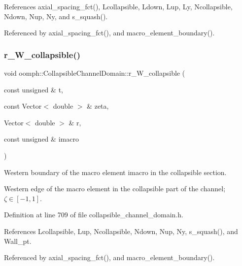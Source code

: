 References axial\+\_\+spacing\+\_\+fct(), Lcollapsible, Ldown, Lup, Ly, Ncollapsible, Ndown, Nup, Ny, and s\+\_\+squash().



Referenced by axial\+\_\+spacing\+\_\+fct(), and macro\+\_\+element\+\_\+boundary().

\mbox{\label{classoomph_1_1CollapsibleChannelDomain_ab8b0f990e596b2725ca8d84f2c9750eb}} 
\subsubsection{\texorpdfstring{r\+\_\+\+W\+\_\+collapsible()}{r\_W\_collapsible()}}
{\footnotesize\ttfamily void oomph\+::\+Collapsible\+Channel\+Domain\+::r\+\_\+\+W\+\_\+collapsible (\begin{DoxyParamCaption}\item[{const unsigned \&}]{t,  }\item[{const Vector$<$ double $>$ \&}]{zeta,  }\item[{Vector$<$ double $>$ \&}]{r,  }\item[{const unsigned \&}]{imacro }\end{DoxyParamCaption})\hspace{0.3cm}{\ttfamily [private]}}



Western boundary of the macro element imacro in the collapsible section. 

Western edge of the macro element in the collapsible part of the channel; $ \zeta \in [-1,1] $. 

Definition at line 709 of file collapsible\+\_\+channel\+\_\+domain.\+h.



References Lcollapsible, Lup, Ncollapsible, Ndown, Nup, Ny, s\+\_\+squash(), and Wall\+\_\+pt.



Referenced by axial\+\_\+spacing\+\_\+fct(), and macro\+\_\+element\+\_\+boundary().

\mbox{\label{classoomph_1_1CollapsibleChannelDomain_a94cebe8b3380c469cfd77924ec57d576}} 
